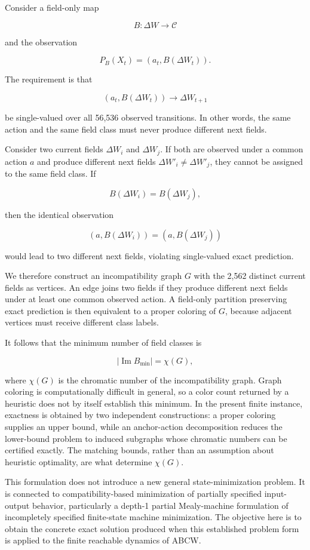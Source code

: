 \documentclass[
  11pt,
]{article}
\begin{document}
Consider a field-only map

\[{B:\Delta W\longrightarrow\mathcal C}\]

and the observation

\[{P_B(X_t)=(a_t,B(\Delta W_t)).}\]

The requirement is that

\[{(a_t,B(\Delta W_t))\longrightarrow\Delta W_{t+1}}\]

be single-valued over all 56,536 observed transitions. In other words,
the same action and the same field class must never produce different
next fields.

Consider two current fields \({\Delta W_i}\) and \({\Delta W_j}\). If
both are observed under a common action \({a}\) and produce different
next fields \({\Delta W'_i\neq\Delta W'_j}\), they cannot be assigned to
the same field class. If

\[{B(\Delta W_i)=B(\Delta W_j),}\]

then the identical observation

\[{(a,B(\Delta W_i))=(a,B(\Delta W_j))}\]

would lead to two different next fields, violating single-valued exact
prediction.

We therefore construct an incompatibility graph \({G}\) with the 2,562
distinct current fields as vertices. An edge joins two fields if they
produce different next fields under at least one common observed action.
A field-only partition preserving exact prediction is then equivalent to
a proper coloring of \({G}\), because adjacent vertices must receive
different class labels.

It follows that the minimum number of field classes is

\[{|\operatorname{Im}B_{\min}|=\chi(G),}\]

where \({\chi(G)}\) is the chromatic number of the incompatibility
graph. Graph coloring is computationally difficult in general, so a
color count returned by a heuristic does not by itself establish this
minimum. In the present finite instance, exactness is obtained by two
independent constructions: a proper coloring supplies an upper bound,
while an anchor-action decomposition reduces the lower-bound problem to
induced subgraphs whose chromatic numbers can be certified exactly. The
matching bounds, rather than an assumption about heuristic optimality,
are what determine \({\chi(G)}\).

This formulation does not introduce a new general state-minimization
problem. It is connected to compatibility-based minimization of
partially specified input-output behavior, particularly a depth-1
partial Mealy-machine formulation of incompletely specified finite-state
machine minimization. The objective here is to obtain the concrete exact
solution produced when this established problem form is applied to the
finite reachable dynamics of ABCW.
\end{document}
